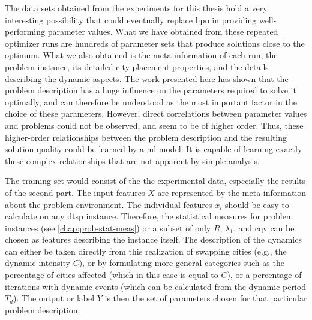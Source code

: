 The data sets obtained from the experiments for this thesis hold a very interesting possibility that could eventually replace \gls{hpo} in providing well-performing parameter values. What we have obtained from these repeated optimizer runs are hundreds of parameter sets that produce solutions close to the optimum. What we also obtained is the meta-information of each run, the problem instance, its detailed city placement properties, and the details describing the dynamic aspects. The work presented here has shown that the problem description has a huge influence on the parameters required to solve it optimally, and can therefore be understood as the most important factor in the choice of these parameters. However, direct correlations between parameter values and problems could not be observed, and seem to be of higher order. Thus, these higher-order relationships between the problem description and the resulting solution quality could be learned by a \gls{ml} model. It is capable of learning exactly these complex relationships that are not apparent by simple analysis.

The training set would consist of the the experimental data, especially the results of the second part. The input features $X$ are represented by the meta-information about the problem environment. The individual features $x_i$ should be easy to calculate on any \gls{dtsp} instance. Therefore, the statistical measures for problem instances (see \cref{chap:prob-stat-meas}) or a subset of only $R$, $\lambda_1$, and \gls{cqv} can be chosen as features describing the instance itself. The description of the dynamics can either be taken directly from this realization of swapping cities (e.g., the dynamic intensity $C$), or by formulating more general categories such as the percentage of cities affected (which in this case is equal to $C$), or a percentage of iterations with dynamic events (which can be calculated from the dynamic period $T_d$).
The output or label $Y$ is then the set of parameters chosen for that particular problem description.


